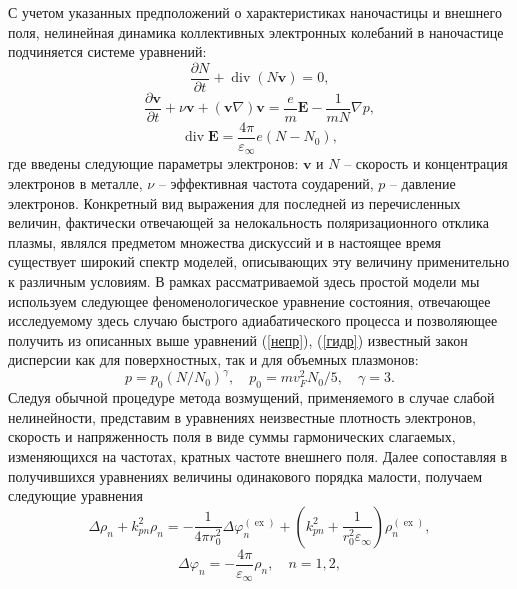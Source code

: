 \documentclass[12pt, a4paper]{article}
\renewcommand{\vec}{\mathbf}
\def \eps {\varepsilon}
\def \ph {\varphi}
\def \ex { \operatorname{ex}}
\newcommand{\dt}[1]{\frac{\partial {#1}}{\partial t}}
\begin{document}
С учетом указанных предположений о характеристиках наночастицы и внешнего поля, нелинейная динамика коллективных электронных колебаний в наночастице подчиняется системе уравнений:
\begin{equation} 
	\label{непр}
	\dt{N} + \operatorname{div}(N \vec{v}) = 0,
\end{equation}
\begin{equation} 
	\label{гидр}
	\dt{\vec{v}} + \nu \vec{v} +(\vec{v} \nabla)\vec{v} = \frac{e}{m}\vec{E} - \frac{1}{mN} \nabla p, 
\end{equation}
\begin{equation} 
	\label{максв}
	\operatorname{div}\vec{E} = \frac{4\pi}{\eps_\infty}e(N-N_0),
\end{equation}
где введены следующие параметры электронов: $\vec{v}$ и $N$ – скорость и концентрация электронов в металле, $\nu$ – эффективная частота соударений, 
$p$ – давление электронов. Конкретный вид выражения для последней из перечисленных величин, фактически отвечающей за нелокальность поляризационного отклика плазмы, являлся предметом множества дискуссий и в настоящее время существует широкий спектр моделей, описывающих эту величину применительно к различным условиям. В рамках рассматриваемой здесь простой модели мы используем следующее феноменологическое уравнение состояния, отвечающее исследуемому здесь случаю быстрого адиабатического процесса и позволяющее получить из описанных выше уравнений (\ref{непр}), (\ref{гидр}) известный закон дисперсии как для поверхностных, так и для объемных плазмонов: 
\begin{equation}
	\label{p}
 p = p_0 (N/N_0)^\gamma, \quad p_0 = m v_F^2 N_0/5, \quad \gamma = 3.
\end{equation}
Следуя обычной процедуре метода возмущений, применяемого в случае слабой нелинейности, представим в уравнениях неизвестные плотность электронов, скорость и напряженность поля в виде суммы гармонических слагаемых, изменяющихся на частотах, кратных частоте внешнего поля. Далее сопоставляя в получившихся уравнениях величины одинакового порядка малости, получаем следующие уравнения
\begin{equation} 
	\label{rho_sys}
 \Delta \rho_{n} + k_{pn}^2\rho_{n} = -\frac{1}{4 \pi r_0^2} \Delta \ph^{(\ex)}_{n} + \left( k_{pn}^2 + \frac{1}{r_0^2\eps_\infty}\right) {\rho^{(\ex)}_{n},}
\end{equation}
\begin{equation} 
	\label{phi_sys}
 \Delta \ph_{n} = - \frac{4 \pi}{\eps_\infty} \rho_{n}, \quad n = 1,2,
\end{equation}
\end{document}
